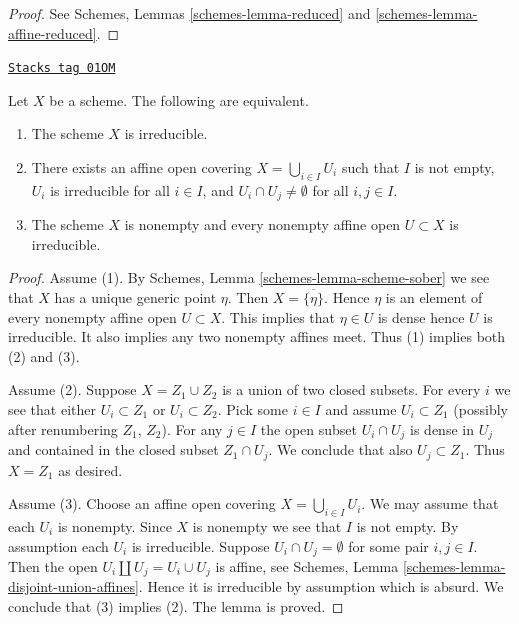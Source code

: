 \begin{proof}
See Schemes, Lemmas \ref{schemes-lemma-reduced} and
\ref{schemes-lemma-affine-reduced}.
\end{proof}

\begin{lemma}
\label{properties-lemma-characterize-irreducible}
\href{https://stacks.math.columbia.edu/tag/01OM}{\texttt{Stacks tag 01OM}}

Let $X$ be a scheme.
The following are equivalent.
\begin{enumerate}
\item The scheme $X$ is irreducible.
\item There exists an affine open covering $X = \bigcup_{i \in I} U_i$
such that $I$ is not empty, $U_i$ is irreducible for all $i \in I$, and
$U_i \cap U_j \not = \emptyset$ for all $i, j \in I$.
\item The scheme $X$ is nonempty and every nonempty affine open
$U \subset X$ is irreducible.
\end{enumerate}
\end{lemma}

\begin{proof}
Assume (1). By Schemes, Lemma \ref{schemes-lemma-scheme-sober}
we see that $X$ has a unique generic point $\eta$. Then
$X = \overline{\{\eta\}}$. Hence $\eta$ is an element of
every nonempty affine open $U \subset X$. This implies
that $\eta \in U$ is dense hence $U$ is irreducible.
It also implies any two nonempty affines meet.
Thus (1) implies both (2) and (3).

\medskip\noindent
Assume (2). Suppose $X = Z_1 \cup Z_2$ is a union of two closed subsets.
For every $i$ we see that either $U_i \subset Z_1$ or $U_i \subset Z_2$.
Pick some $i \in I$ and assume $U_i \subset Z_1$ (possibly after renumbering
$Z_1$, $Z_2$). For any $j \in I$ the open subset $U_i \cap U_j$ is dense in
$U_j$ and contained in the closed subset $Z_1 \cap U_j$. We conclude that
also $U_j \subset Z_1$. Thus $X = Z_1$ as desired.

\medskip\noindent
Assume (3). Choose an affine open covering $X = \bigcup_{i \in I} U_i$.
We may assume that each $U_i$ is nonempty.
Since $X$ is nonempty we see that $I$ is not empty.
By assumption each $U_i$ is irreducible.
Suppose $U_i \cap U_j = \emptyset$ for some pair $i, j \in I$.
Then the open $U_i \amalg  U_j = U_i \cup U_j$ is affine, see
Schemes, Lemma \ref{schemes-lemma-disjoint-union-affines}.
Hence it is irreducible by assumption which is absurd. We conclude that (3)
implies (2). The lemma is proved.
\end{proof}

